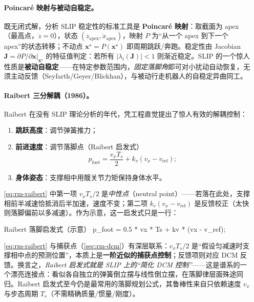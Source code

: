 \paragraph{Poincaré 映射与被动自稳定。}
既无闭式解，分析 SLIP 稳定性的标准工具是 \textbf{Poincaré 映射}：取截面为 apex（最高点，$\dot{z}=0$），状态 $(z_{\mathrm{apex}},\dot{x}_{\mathrm{apex}})$，映射 $P$ 为“从一个 apex 到下一个 apex”的状态转移；不动点 $\mathbf{x}^\star=P(\mathbf{x}^\star)$ 即周期跳跃/奔跑。稳定性由 Jacobian $\mathbf{J}=\partial P/\partial\mathbf{x}|_{\mathbf{x}^\star}$ 的特征值判定：若所有 $|\lambda_i(\mathbf{J})|<1$ 则渐近稳定。SLIP 的一个惊人性质是\textbf{被动自稳定}——在特定参数范围内，\emph{固定落脚角}即可对小扰动自动恢复，无须主动反馈（Seyfarth/Geyer/Blickhan\cite{geyer2006compliant}），与被动行走机器人的自稳定异曲同工。

\paragraph{Raibert 三分解耦（1986）。}
Raibert 在没有 SLIP 理论分析的年代，凭工程直觉提出了惊人有效的解耦控制\cite{raibert1986legged}：
\begin{enumerate}
  \item \textbf{跳跃高度}：调节弹簧推力；
  \item \textbf{前进速度}：调节落脚点（Raibert 启发式）
    \begin{equation}
      p_{\mathrm{foot}}=\frac{v_x T_s}{2}+k_v(v_x-v_{\mathrm{ref}});
      \label{eq:rm-raibert}
    \end{equation}
  \item \textbf{身体姿态}：支撑相中用髋关节力矩保持身体水平。
\end{enumerate}
\cref{eq:rm-raibert} 中第一项 $v_x T_s/2$ 是\emph{中性点}（neutral point）——若落在此处，支撑相前半减速恰抵消后半加速，速度不变；第二项 $k_v(v_x-v_{\mathrm{ref}})$ 是反馈校正（太快则落脚偏前以多减速）。作为示意，这一启发式只是一行：
\begin{codebox}[C++]{Raibert 落脚启发式（示意）}
p_foot = 0.5 * vx * Ts + kv * (vx - v_ref);
\end{codebox}

\begin{insight}
\cref{eq:rm-raibert} 与捕获点（\cref{sec:rm-dcm}）有深层联系：$v_x T_s/2$ 是“假设匀减速时支撑相中点的预测位置”，本质上是\textbf{一阶近似的捕获点控制}；反馈项则对应 DCM 反馈。换言之，\emph{Raibert 启发式就是 SLIP 上的“简化 DCM 控制”}——这是谱系的一个漂亮连接点：看似各自独立的弹簧倒立摆与线性倒立摆，在落脚律层面殊途同归。Raibert 启发式至今仍是最常用的落脚规划公式，其鲁棒性来自只依赖速度 $v_x$ 与步态周期 $T_s$（不需精确质量/惯量/刚度）。
\end{insight}

